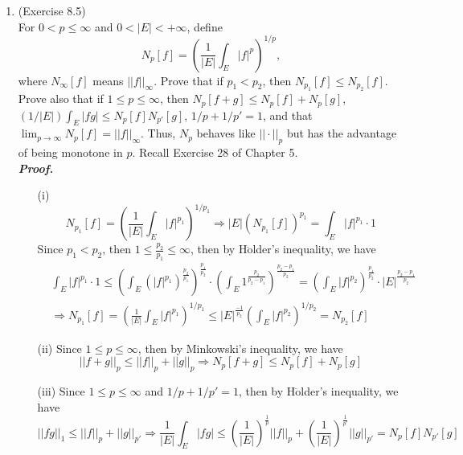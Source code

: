 \documentclass[a4paper,11pt]{article}
\begin{document}
\begin{enumerate}
	\item (Exercise 8.5)\\
		For $0 < p \leq \infty$ and $0 < |E| < +\infty$, define
			$$N_p[f] = \left( \frac{1}{|E|} \int_E |f|^p \right)^{1/p},$$
		where $N_\infty[f]$ means $||f||_\infty$. Prove that if $p_1 < p_2$, then $N_{p_1}[f] \leq N_{p_2}[f]$. Prove also that if $1 \leq p \leq \infty$, then $N_p[f+g] \leq N_p[f] + N_p[g]$, $(1/|E|)\int_E |fg| \leq N_p[f] N_{p'}[g]$, $1/p + 1/p' = 1$, and that $\lim_{p \to \infty} N_p[f] = ||f||_\infty$. Thus, $N_p$ behaves like $||\cdot||_p$ but has the advantage of being monotone in $p$. Recall Exercise 28 of Chapter 5.\\
	\newline
 	\textit{\textbf {Proof.}}\\
 	\begin{enumerate}
 		\item[(i)]
	 			$$N_{p_1}[f]
	 			= \left( \frac{1}{|E|} \int_E |f|^{p_1} \right)^{1/p_1}
	 			\Rightarrow |E| \left( N_{p_1}[f] \right)^{p_1}
	 			= \int_E |f|^{p_1} \cdot 1$$
	 		Since $p_1 < p_2$, then $1 \leq \frac{p_2}{p_1} \leq \infty$, then by H$\ddot{\text{o}}$lder's inequality, we have
	 			$$\begin{aligned}
	 			&\int_E |f|^{p_1} \cdot 1
	 			\leq \left( \int_E (|f|^{p_1})^{\frac{p_2}{p_1}} \right)^{\frac{p_1}{p_2}} \cdot \left( \int_E 1^{\frac{p_2}{p_2 - p_1}} \right)^{\frac{p_2 - p_1}{p_2}}
	 			= \left( \int_E |f|^{p_2} \right)^{\frac{p_1}{p_2}} \cdot |E|^{\frac{p_2 - p_1}{p_2}}\\
	 			&\Rightarrow N_{p_1}[f]
	 			= \left( \frac{1}{|E|} \int_E |f|^{p_1} \right)^{1/p_1}
	 			\leq |E|^{\frac{-1}{p_2}} \left( \int_E |f|^{p_2} \right)^{1/p_2}
	 			= N_{p_2}[f]
	 			\end{aligned}$$

	 	\item[(ii)]
	 		Since $1 \leq p \leq \infty$, then by Minkowski's inequality, we have
	 			$$||f + g||_p \leq ||f||_p + ||g||_p
	 			\Rightarrow N_p[f+g] \leq N_p[f] + N_p[g]$$

	 	\item[(iii)]
	 		Since $1 \leq p \leq \infty$ and $1/p + 1/p' = 1$, then by H$\ddot{\text{o}}$lder's inequality, we have
	 			$$||fg||_1 \leq ||f||_p + ||g||_{p'}
	 			\Rightarrow \frac{1}{|E|} \int_E |fg|
	 			\leq \left( \frac{1}{|E|} \right)^{\frac{1}{p}} ||f||_p + \left( \frac{1}{|E|} \right)^{\frac{1}{p'}} ||g||_{p'}
	 			= N_p[f] N_{p'}[g]$$


\end{enumerate}
\end{enumerate}
\end{document}
